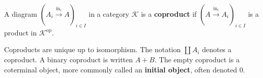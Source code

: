 A diagram $(A_i \xrightarrow{\text{in}_i} A)_{i \in I}$ in a category $\mathcal{K}$ is a \textbf{coproduct} if $(A \xrightarrow{\text{in}_i} A_i)_{i \in I}$ is a product in $\mathcal{K}^{\text{op}}$.

Coproducts are unique up to isomorphism. The notation $\coprod A_i$ denotes a coproduct. A binary coproduct is written $A + B$. The empty coproduct is a coterminal object, more commonly called an \textbf{initial object}, often denoted $0$.
